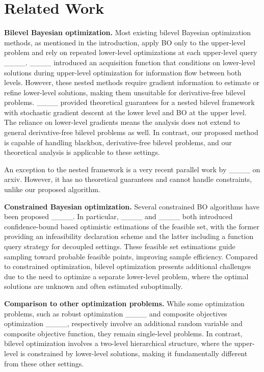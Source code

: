 \section{Related Work}
\textbf{Bilevel Bayesian optimization.} Most existing bilevel Bayesian optimization methods, as mentioned in the introduction, apply BO only to the upper-level problem and rely on repeated lower-level optimizations at each upper-level query ____. ____ introduced an acquisition function that conditions on lower-level solutions during upper-level optimization for information flow between both levels. However, these nested methods require gradient information to estimate or refine lower-level solutions, making them unsuitable for derivative-free bilevel problems. ____ provided theoretical guarantees for a nested bilevel framework with stochastic gradient descent at the lower level and BO at the upper level. The reliance on lower-level gradients means the analysis does not extend to general derivative-free bilevel problems as well. In contrast, our proposed method is capable of handling blackbox, derivative-free bilevel problems, and our theoretical analysis is applicable to these settings.

An exception to the nested framework is a very recent parallel work by ____ on arxiv. However, it has no theoretical guarantees and cannot handle constraints, unlike our proposed algorithm.

\textbf{Constrained Bayesian optimization.} 
Several constrained BO algorithms have been proposed ____. In particular, ____ and ____ both introduced confidence-bound based optimistic estimations of the feasible set, with the former providing an infeasibility declaration scheme and the latter including a function query strategy for decoupled settings. These feasible set estimations guide sampling toward probable feasible points, improving sample efficiency. Compared to constrained optimization, bilevel optimization presents additional challenges due to the need to optimize a separate lower-level problem, where the optimal solutions are unknown and often estimated suboptimally.

\textbf{Comparison to other optimization problems.} While some optimization problems, such as robust optimization ____ and composite objectives optimization ____, respectively involve an additional random variable and composite objective function, they remain single-level problems. In contrast, bilevel optimization involves a two-level hierarchical structure, where the upper-level is constrained by lower-level solutions, making it fundamentally different from these other settings.